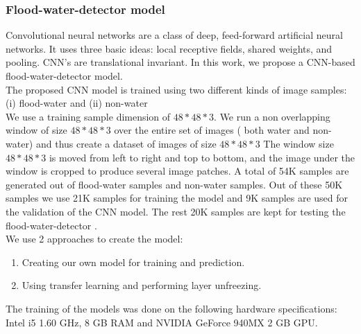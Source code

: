 \documentclass{IEEEtran}
\begin{document}
\subsubsection{Flood-water-detector model}
Convolutional neural networks are a class of deep, feed-forward artificial neural networks. It uses three basic ideas: local receptive fields, shared weights, and pooling. CNN's are translational invariant. In this work, we propose a CNN-based flood-water-detector model.\\
The proposed CNN model is trained using two different kinds of image samples: {(i) flood-water and (ii) non-water}\\
 We use a training sample dimension of $48*48*3$. We run a non overlapping window of size $48*48*3$ over the entire set of images ( both water and non-water) and thus create a dataset of images of size $48*48*3$ The window size $48*48*3$ is moved from left to right and top to bottom, and the image under the window is cropped to produce several image patches.  A total of 54K samples are generated out of flood-water samples and non-water samples. Out of these 50K samples we use 21K samples for training the model and 9K samples are used for the validation of the CNN model. The rest 20K samples are kept for testing the flood-water-detector . \\
We use 2 approaches to create the model:
	\begin{enumerate}
	\item Creating our own model for training and prediction.
	\item Using transfer learning and performing layer unfreezing.
	\end{enumerate}
The training of the models was done on the following
hardware specifications: Intel i5 1.60 GHz, 8 GB RAM and NVIDIA GeForce 940MX 2 GB GPU.
\end{document}
